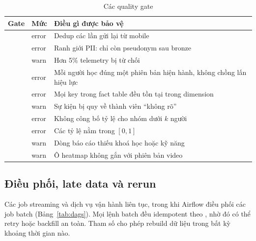 \begin{table}[H]
\centering\small
\caption{Các quality gate}\label{tab:dq}
\begin{tabularx}{\textwidth}{@{}L{5.6cm}L{1.6cm}Y@{}}
\toprule
\textbf{Gate} & \textbf{Mức} & \textbf{Điều gì được bảo vệ} \\
\midrule
{} & error & Dedup các lần gửi lại từ mobile \\
 & error & Ranh giới PII: chỉ còn pseudonym sau bronze \\
 & warn & Hơn 5\% telemetry bị từ chối \\
 & error & Mỗi người học đúng một phiên bản hiện hành, không chồng lấn hiệu lực \\
 & error & Mọi key trong fact table đều tồn tại trong dimension \\
 & warn & Sự kiện bị quy về thành viên ``không rõ'' \\
 & error & Không công bố tỷ lệ cho nhóm dưới $k$ người \\
 & error & Các tỷ lệ nằm trong $[0, 1]$ \\
 & warn & Dòng báo cáo thiếu khoá học hoặc kỹ năng \\
 & warn & Ô heatmap không gắn với phiên bản video \\
\bottomrule
\end{tabularx}
\end{table}

\subsection{Điều phối, late data và rerun}
\label{sec:late}

Các job streaming và dịch vụ vận hành liên tục, trong khi Airflow điều phối các job batch (Bảng~\ref{tab:dags}). Mọi lệnh batch đều idempotent theo , nhờ đó có thể retry hoặc backfill an toàn. Tham số  cho phép rebuild dữ liệu trong bất kỳ khoảng thời gian nào.


